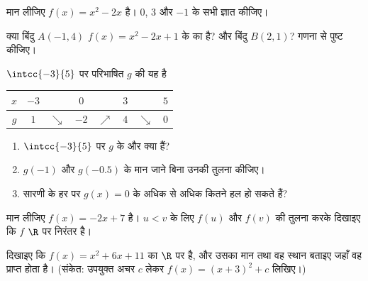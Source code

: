 \begin{exercise}[$\star$]\label{exo:g10:functions:3}
मान लीजिए $f(x) = x^2 - 2x$ है। $0$, $3$ और $-1$ के सभी  ज्ञात
कीजिए।
\end{exercise}

\begin{exercise}[$\star$]\label{exo:g10:functions:4}
क्या बिंदु $A(-1, 4)$ $f(x) = x^2 - 2x + 1$ के  का है? और बिंदु $B(2, 1)$? गणना से पुष्ट कीजिए।
\end{exercise}

\begin{exercise}[$\star$]\label{exo:g10:functions:5}
$\intcc{-3}{5}$ पर परिभाषित  $g$ की  यह है
\begin{center}
\renewcommand{\arraystretch}{1.3}
\begin{tabular}{c|ccccccc}
$x$ & $-3$ & & $0$ & & $3$ & & $5$ \\
\hline
$g$ & $1$ & $\searrow$ & $-2$ & $\nearrow$ & $4$ & $\searrow$ & $0$ \\
\end{tabular}
\end{center}
\begin{enumerate}
  \item $\intcc{-3}{5}$ पर $g$ के  और  क्या हैं?
  \item $g(-1)$ और $g(-0.5)$ के मान जाने बिना उनकी तुलना कीजिए।
  \item सारणी के हर  पर  $g(x) = 0$ के अधिक से अधिक कितने हल हो
        सकते हैं?
\end{enumerate}
\end{exercise}

\begin{exercise}[$\star\star$]\label{exo:g10:functions:6}
मान लीजिए $f(x) = -2x + 7$ है। $u < v$ के लिए $f(u)$ और $f(v)$ की तुलना करके दिखाइए कि
$f$ $\R$ पर निरंतर  है।
\end{exercise}

\begin{exercise}[$\star\star$]\label{exo:g10:functions:7}
दिखाइए कि  $f(x) = x^2 + 6x + 11$ का $\R$ पर  है, और उसका मान तथा वह स्थान
बताइए जहाँ वह प्राप्त होता है। (संकेत: उपयुक्त अचर $c$ लेकर $f(x) = (x + 3)^2 + c$
लिखिए।)
\end{exercise}


